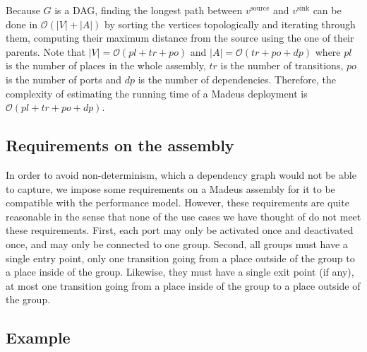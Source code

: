 Because $G$ is a DAG, finding the longest path between $v^\text{source}$
and $v^\text{sink}$ can be done in $\mathcal{O}(|V|+|A|)$ by sorting the
vertices topologically and iterating through them, computing their maximum
distance from the source using the one of their parents. Note that
$|V| = \mathcal{O}(pl+tr+po)$ and $|A| = \mathcal{O}(tr+po+dp)$ where $pl$
is the number of places in the whole assembly, $tr$ is the number of
transitions, $po$ is the number of ports and $dp$ is the number of
dependencies. Therefore, the complexity of estimating the running time of
a Madeus deployment is $\mathcal{O}(pl+tr+po+dp)$.


\subsection{Requirements on the assembly}

In order to avoid non-determinism, which a dependency graph would not be
able to capture, we impose some requirements on a Madeus assembly
for it to be compatible with the performance model. However, these
requirements are quite reasonable in the sense that none of the use
cases we have thought of do not meet these requirements.
%
First, each port may only be activated once and deactivated once, and
may only be connected to one group. Second, all groups must have a
single entry point, \ie only one transition going from a place outside
of the group to a place inside of the group. Likewise, they must have a
single exit point (if any), \ie at most one transition going from a
place inside of the group to a place outside of the group.

\subsection{Example}

